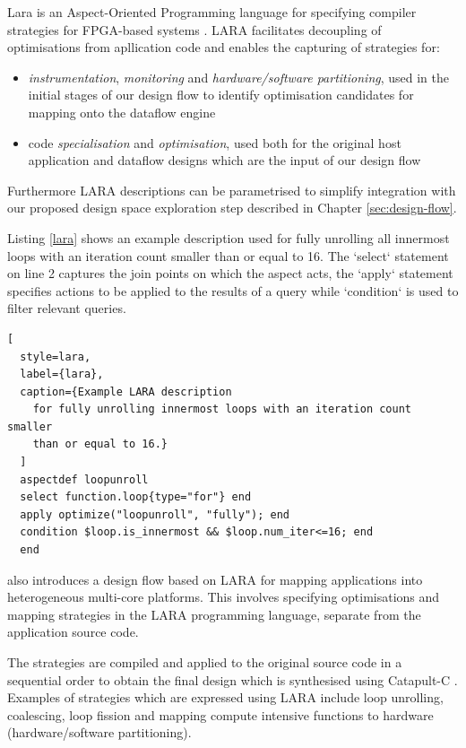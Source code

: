 Lara is an Aspect-Oriented Programming language for specifying
compiler strategies for FPGA-based systems
\cite{Cardoso:Teixeira:Alves:Nobre:Diniz:Cutinho:Luk:2012}. LARA
facilitates decoupling of optimisations from apllication code and
enables the capturing of strategies for:

\begin{itemize}
\item \emph{instrumentation}, \emph{monitoring} and
  \emph{hardware/software partitioning}, used in the initial stages of
  our design flow to identify optimisation candidates for mapping onto
  the dataflow engine

\item code \emph{specialisation} and \emph{optimisation}, used both
  for the original host application and dataflow designs which are the
  input of our design flow
\end{itemize}

Furthermore LARA descriptions can be parametrised to simplify
integration with our proposed design space exploration step described
in Chapter \ref{sec:design-flow}.

Listing \ref{lara} shows an example description used for fully
unrolling all innermost loops with an iteration count smaller than or
equal to 16. The `select` statement on line 2 captures the join points
on which the aspect acts, the `apply` statement specifies actions to
be applied to the results of a query while `condition` is used to
filter relevant queries.

\begin{lstlisting}[
  style=lara,
  label={lara},
  caption={Example LARA description
    for fully unrolling innermost loops with an iteration count smaller
    than or equal to 16.}
  ]
  aspectdef loopunroll
  select function.loop{type="for"} end
  apply optimize("loopunroll", "fully"); end
  condition $loop.is_innermost && $loop.num_iter<=16; end
  end
\end{lstlisting}

\cite{Cardoso:Carvalho:Teixeira:Diniz:Goncalves:Petrov:2012} also
introduces a design flow based on LARA for mapping applications into
heterogeneous multi-core platforms. This involves specifying
optimisations and mapping strategies in the LARA programming language,
separate from the application source code.

The strategies are compiled and applied to the original source code in
a sequential order to obtain the final design which is synthesised
using Catapult-C \cite{CatapultC}. Examples of strategies which are
expressed using LARA include loop unrolling, coalescing, loop fission
and mapping compute intensive functions to hardware (hardware/software
partitioning).

